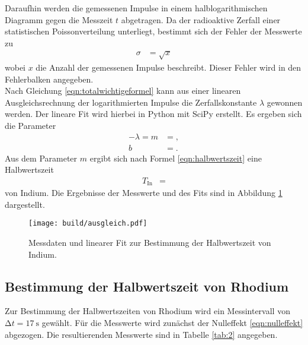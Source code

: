 

Daraufhin werden die gemessenen Impulse in einem halblogarithmischen Diagramm gegen die Messzeit $t$ abgetragen.
Da der radioaktive Zerfall einer statistischen Poissonverteilung unterliegt, bestimmt sich der Fehler der Messwerte zu
\begin{align*}
  \sigma &= \sqrt{x}
\end{align*}
wobei $x$ die Anzahl der gemessenen Impulse beschreibt.
Dieser Fehler wird in den Fehlerbalken angegeben.\\
Nach Gleichung \eqref{eqn:totalwichtigeformel} kann aus einer linearen Ausgleichsrechnung der logarithmierten Impulse die Zerfallskonstante $\lambda$ gewonnen werden.
Der lineare Fit wird hierbei in Python mit SciPy erstellt.
Es ergeben sich die Parameter
\begin{align*}
  -\lambda = m &= , \\
  b &= .
\end{align*}
Aus dem Parameter $m$ ergibt sich nach Formel \eqref{eqn:halbwertszeit} eine Halbwertszeit
\begin{align*}
  T_\text{In} &= 
\end{align*}
von Indium.
Die Ergebnisse der Messwerte und des Fits sind in Abbildung \ref{fig:plot1} dargestellt.

\begin{figure}
  \centering
  \texttt{[image: build/ausgleich.pdf]}
  \caption{Messdaten und linearer Fit zur Bestimmung der Halbwertszeit von Indium.}
  \label{fig:plot1}
\end{figure}

\subsection{Bestimmung der Halbwertszeit von Rhodium}

Zur Bestimmung der Halbwertszeiten von Rhodium wird ein Messintervall von $\increment t = \SI{17}{\second}$ gewählt.
Für die Messwerte wird zunächst der Nulleffekt \eqref{eqn:nulleffekt} abgezogen.
Die resultierenden Messwerte sind in Tabelle \ref{tab:2} angegeben.

%

%


